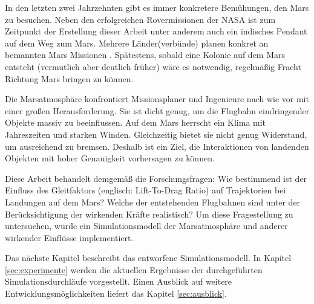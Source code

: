 In den letzten zwei Jahrzehnten gibt es immer konkretere Bemühungen, den Mars zu besuchen. Neben den erfolgreichen Rovermissionen der NASA ist zum Zeitpunkt der Erstellung dieser Arbeit unter anderem auch ein indisches Pendant auf dem Weg zum Mars. Mehrere Länder(verbünde) planen konkret an bemannten Mars Missionen \cite{Wikipedia2016}. Spätestens, sobald eine Kolonie auf dem Mars entsteht (vermutlich aber deutlich früher) wäre es notwendig, regelmäßig Fracht Richtung Mars bringen zu können.

Die Marsatmosphäre konfrontiert Missionsplaner und Ingenieure nach wie vor mit einer großen Herausforderung. Sie ist dicht genug, um die Flugbahn eindringender Objekte massiv zu beeinflussen. Auf dem Mars herrscht ein Klima mit Jahreszeiten und starken Winden. Gleichzeitig bietet sie nicht genug Widerstand, um ausreichend zu bremsen. Deshalb ist ein Ziel, die Interaktionen von landenden Objekten mit hoher Genauigkeit vorhersagen zu können.

Diese Arbeit behandelt demgemäß die Forschungsfragen: Wie bestimmend ist der Einfluss des Gleitfaktors (englisch: Lift-To-Drag Ratio) auf Trajektorien bei Landungen auf dem Mars? Welche der entstehenden Flugbahnen sind unter der Berücksichtigung der wirkenden Kräfte realistisch? Um diese Fragestellung zu untersuchen, wurde ein Simulationsmodell der Marsatmosphäre und anderer wirkender Einflüsse implementiert.

Das nächste Kapitel beschreibt das entworfene Simulationsmodell. In Kapitel \ref{sec:experimente} werden die aktuellen Ergebnisse der durchgeführten Simulationsdurchläufe vorgestellt. Einen Ausblick auf weitere Entwicklungsmöglichkeiten liefert das Kapitel \ref{sec:ausblick}.